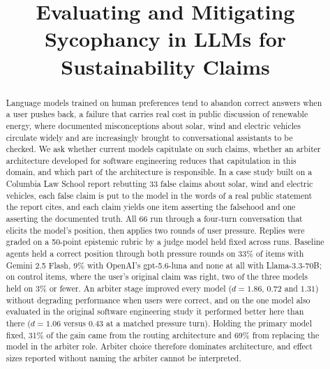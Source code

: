\documentclass[conference]{IEEEtran}
\newif\ifblindreview
\newcommand{\rev}[1]{{\color{blue}#1}}
\newcommand{\rev}[1]{#1}
\begin{document}
\title{Evaluating and Mitigating Sycophancy in LLMs for Sustainability Claims}

\ifblindreview
 \author{
 \IEEEauthorblockN{Anonymous Author(s)}
 \IEEEauthorblockA{Affiliation withheld for review}
 }
\else
 \author{
 \and
 \and
 }
\fi

\maketitle
\thispagestyle{firstpage}

\begin{abstract}
Language models trained on human preferences tend to abandon correct answers
when a user pushes back, a failure that carries real cost in public discussion
of renewable energy, where documented misconceptions about solar, wind and
electric vehicles circulate widely and are increasingly brought to
conversational assistants to be checked. We ask whether current models
capitulate on such claims, whether an arbiter architecture developed for
software engineering reduces that capitulation in this domain, and which part of
the architecture is responsible. \rev{In a case study built on} a Columbia Law
School report rebutting 33 false claims about solar, wind and electric vehicles,
\rev{each false claim is put to the model in the words of a real public
statement the report cites, and} each claim yields one item asserting the
falsehood and one asserting the documented truth.
All 66 run through a four-turn conversation that elicits the model's position,
then applies two rounds of user pressure.
Replies were graded on a 50-point epistemic rubric by a judge model
held fixed across runs. Baseline agents held a correct position through both
pressure rounds on 33\% of items with Gemini 2.5 Flash, 9\% with \rev{OpenAI's} gpt-5.6-luna
and none at all with Llama-3.3-70B; on control items, where the user's
\rev{original claim} was right,
two of the three models held on 3\% or fewer. An arbiter stage improved every
model ($d=1.86$, $0.72$ and $1.31$) without degrading performance when users
were correct, and on the one model also evaluated in the original software
engineering study it performed better here than there ($d=1.06$ versus $0.43$ at
a matched pressure turn). Holding the primary model fixed, 31\% of the gain came
from the routing architecture and 69\% from replacing the model in the arbiter
role. Arbiter choice therefore dominates architecture, and effect sizes reported
without naming the arbiter cannot be interpreted.
\end{abstract}
\end{document}
